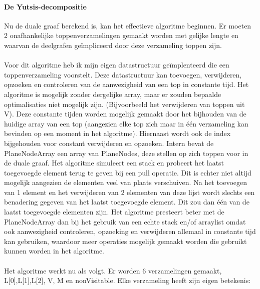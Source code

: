 \documentclass[11pt, a4paper, table]{article}
\theoremstyle{definition}
\theoremstyle{definition}
\theoremstyle{definition}
\begin{document}
\paragraph{De Yutsis-decompositie}
\label{sec:yutsus}
Nu de duale graaf berekend is, kan het effectieve algoritme beginnen. Er moeten 2 onafhankelijke toppenverzamelingen gemaakt worden met gelijke lengte en waarvan de deelgrafen ge\"{i}mpliceerd door deze verzameling toppen zijn. 
\\\\Voor dit algoritme heb ik mijn eigen datastructuur ge\"{i}mplenteerd die een toppenverzameling voorstelt. Deze datastructuur kan toevoegen, verwijderen, opzoeken en controleren van de aanwezigheid van een top in constante tijd. Het algoritme is mogelijk zonder dergelijke array, maar er zouden bepaalde optimalisaties niet mogelijk zijn. (Bijvoorbeeld het verwijderen van toppen uit V). Deze constante tijden worden mogelijk gemaakt door het bijhouden van de huidige array van een top (aangezien elke top zich maar in \'{e}\'{e}n verzameling kan bevinden op een moment in het algoritme). Hiernaast wordt ook de index bijgehouden voor constant verwijderen en opzoeken.
Intern bevat de PlaneNodeArray een array van PlaneNodes, deze stellen op zich toppen voor in de duale graaf. Het algoritme simuleert een stack en probeert het laatst toegevoegde element terug te geven bij een pull operatie. Dit is echter niet altijd mogelijk aangezien de elementen veel van plaats verschuiven. Na het toevoegen van 1 element en het verwijderen van 2 elementen van deze lijst wordt slechts een benadering gegeven van het laatst toegevoegde element. Dit zou dan \'{e}\'{e}n van de laatst toegevoegde elementen zijn. Het algoritme presteert beter met de PlaneNodeArray dan bij het gebruik van een echte stack en/of arraylist omdat ook aanwezigheid controleren, opzoeking en verwijderen allemaal in constante tijd kan gebruiken, waardoor meer operaties mogelijk gemaakt worden die gebruikt kunnen worden in het algoritme.
\\\\Het algoritme werkt nu als volgt. Er worden 6 verzamelingen gemaakt, L[0],L[1],L[2], V, M en nonVisitable. Elke verzameling heeft zijn eigen betekenis: 
\end{document}
